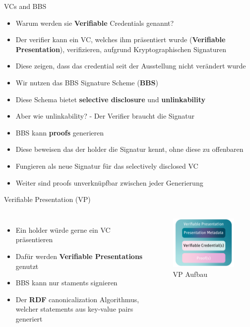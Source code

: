 \documentclass[
	ngerman,%
	authorontitle=true,
	]{bfhbeamer}
\begin{document}
\begin{frame}{VCs and BBS}
    \begin{itemize}
        \item Warum werden sie \textbf{Verifiable} Credentials genannt?
        \item Der verifier kann ein VC, welches ihm präsentiert wurde (\textbf{Verifiable Presentation}), verifizieren, aufgrund Kryptographischen Signaturen
        \item Diese zeigen, dass das credential seit der Ausstellung nicht verändert wurde
        \item Wir nutzen das BBS Signature Scheme (\textbf{BBS}) 
        \item Diese Schema bietet \textbf{selective disclosure} und \textbf{unlinkability}
        \item Aber wie unlinkability? - Der Verifier braucht die Signatur
        \item BBS kann \textbf{proofs} generieren
        \item Diese beweisen das der holder die Signatur kennt, ohne diese zu offenbaren
        \item Fungieren als neue Signatur für das selectively disclosed VC
        \item Weiter sind proofs unverknüpfbar zwischen jeder Generierung
    \end{itemize}
\end{frame}

\begin{frame}{Verifiable Presentation (VP)}
    \begin{columns}[onlytextwidth,T]
        \column{70mm}  
        \begin{itemize}
            \item Ein holder würde gerne ein VC präsentieren
            \item Dafür werden \textbf{Verifiable Presentations} genutzt
            \item BBS kann nur staments signieren
            \item Der \textbf{RDF} canonicalization Algorithmus, welcher statements aus key-value pairs generiert
        \end{itemize}

        \column{70mm}

        \begin{figure}
            \centering
            \includegraphics[width=70mm]{../img/VP.png}
            \caption{VP Aufbau}
        \end{figure}

    \end{columns}
\end{frame}
\end{document}
